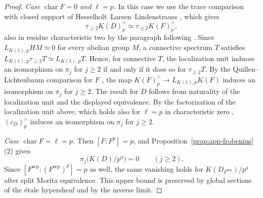 \begin{proof}
\emph{Case $\operatorname{char}F=0$ and $\ell=p$.}
In this case we use the trace comparison with closed support of Hesselholt--Larsen--Lindenstrauss \cite[Theorem B(1) and Theorem 2.5]{HesselholtLarsenLindenstrauss2020}, which gives
\[
 \tau_{\ge2}K(D)^\wedge_p\simeq\tau_{\ge2}K(F)^\wedge_p,
\]
also in residue characteristic two by the paragraph following \cite[Theorem B]{HesselholtLarsenLindenstrauss2020}.
Since $L_{K(1),p}HM\simeq0$ for every abelian group $M$, a connective spectrum $T$ satisfies $L_{K(1),p}\tau_{\ge2}T\simeq L_{K(1),p}T$.
Hence, for connective $T$, the localization unit induces an isomorphism on $\pi_j$ for $j\ge2$ if and only if it does so for $\tau_{\ge2}T$.
By the Quillen--Lichtenbaum comparison for $F$ \cite[Theorems 6.13(1) and 7.13--7.14]{ClausenMathew}, the map $K(F)^\wedge_p\to L_{K(1),p}K(F)$ induces an isomorphism on $\pi_j$ for $j\ge2$.
The result for $D$ follows from naturality of the localization unit and the displayed equivalence.
By the factorization of the localization unit above, which holds also for $\ell=p$ in characteristic zero \cite[Example 6.3]{ClausenMathew}, $(c_D)^\wedge_p$ induces an isomorphism on $\pi_j$ for $j\ge2$.

\emph{Case $\operatorname{char}F=\ell=p$.}
Then $[F:F^p]=p$, and Proposition~\ref{prop:app-frobenius}(2) gives
\[
 \pi_j\bigl(K(D)/p^a\bigr)=0\qquad(j\ge2).
\]
Since $[F^{\mathrm{sep}}:(F^{\mathrm{sep}})^p]=p$ as well, the same vanishing holds for $K(D_{F^{\mathrm{sep}}})/p^a$ after split Morita equivalence.
This upper bound is preserved by global sections of the \'etale hypersheaf and by the inverse limit.
\end{proof}


